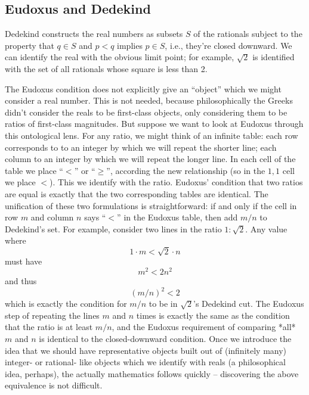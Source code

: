\subsection{Eudoxus and Dedekind}
Dedekind constructs the real numbers as subsets $S$ of the rationals subject to
the property that $q \in S$ and $p<q$ implies $p \in S$, i.e., they're closed
downward. We can identify the real with the obvious limit point; for example,
$\sqrt{2}$ is identified with the set of all rationals whose square is less
than 2.

The Eudoxus condition does not explicitly give an ``object'' which we might consider a real
number. This is not needed, because
philosophically the Greeks didn't consider the reals to be first-class objects,
only considering them to be ratios of first-class magnitudes. But suppose we want to look
at Eudoxus through this ontological lens. For any ratio, we might think of an infinite table:
each row corresponds to to an integer by which we will repeat the shorter line;
each column to an integer by which we will repeat the longer line. In each cell of the table we place ``$<$'' or ``$\geq$'',
according the new relationship (so in the $1,1$ cell we place $<$). This we
identify with the ratio. Eudoxus' condition that two ratios are equal is
exactly that the two corresponding tables are identical.
The unification of these two formulations is straightforward: if and only if the
cell in row $m$ and column $n$ says ``$<$'' in the Eudoxus table, then add $m/n$
to Dedekind's set. For example, consider two lines in the ratio $1:\sqrt{2}$.
Any value where
\[1\cdot m < \sqrt{2} \cdot n\]
must have
\[m^2 < 2n^2\]
and thus
\[(m/n)^2 < 2\]
which is exactly the condition for $m/n$ to be in $\sqrt{2}$'s Dedekind cut.
The Eudoxus step of repeating the lines $m$ and $n$ times is exactly the same
as the condition that the ratio is at least $m/n$, and the Eudoxus requirement
of comparing *all* $m$ and $n$ is identical to the closed-downward condition.
Once we introduce the idea that we should have representative objects built out
of (infinitely many) integer- or rational- like objects which we identify with
reals (a philosophical idea, perhaps), the actually mathematics follows quickly
-- discovering the above equivalence is not difficult.

